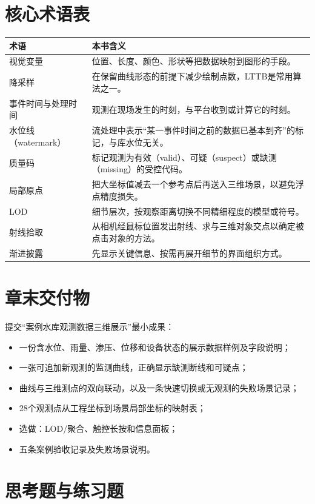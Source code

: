 \section*{核心术语表}

\begin{longtable}{p{2.6cm}p{10.0cm}}
\toprule
术语 & 本书含义 \\
\midrule
视觉变量 & 位置、长度、颜色、形状等把数据映射到图形的手段。 \\
降采样 & 在保留曲线形态的前提下减少绘制点数，LTTB是常用算法之一。 \\
事件时间与处理时间 & 观测在现场发生的时刻，与平台收到或计算它的时刻。 \\
水位线（watermark） & 流处理中表示“某一事件时间之前的数据已基本到齐”的标记，与库水位无关。 \\
质量码 & 标记观测为有效（valid）、可疑（suspect）或缺测（missing）的受控代码。 \\
局部原点 & 把大坐标值减去一个参考点后再送入三维场景，以避免浮点精度损失。 \\
LOD & 细节层次，按观察距离切换不同精细程度的模型或符号。 \\
射线拾取 & 从相机经鼠标位置发出射线、求与三维对象交点以确定被点击对象的方法。 \\
渐进披露 & 先显示关键信息、按需再展开细节的界面组织方式。 \\
\bottomrule
\end{longtable}

\section*{章末交付物}

提交“案例水库观测数据三维展示”最小成果：

\begin{itemize}
\item 一份含水位、雨量、渗压、位移和设备状态的展示数据样例及字段说明；
\item 一张可追加新观测的监测曲线，正确显示缺测断线和可疑点；
\item 曲线与三维测点的双向联动，以及一条快速切换或无观测的失败场景记录；
\item 28个观测点从工程坐标到场景局部坐标的映射表；
\item 选做：LOD/聚合、触控长按和信息面板；
\item 五条案例验收记录及失败场景说明。
\end{itemize}

\section*{思考题与练习题}


